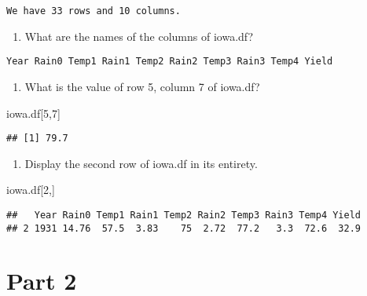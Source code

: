 \documentclass[
]{article}
\newenvironment{Shaded}{\begin{snugshade}}{\end{snugshade}}
\newcommand{\DecValTok}[1]{\textcolor[rgb]{0.00,0.00,0.81}{#1}}
\newcommand{\NormalTok}[1]{#1}
\providecommand{\tightlist}{%
  \setlength{\itemsep}{0pt}\setlength{\parskip}{0pt}}
\begin{document}
\begin{verbatim}
We have 33 rows and 10 columns.
\end{verbatim}

\begin{enumerate}
\def\labelenumi{\alph{enumi}.}
\setcounter{enumi}{2}
\tightlist
\item
  What are the names of the columns of iowa.df?
\end{enumerate}

\begin{verbatim}
Year Rain0 Temp1 Rain1 Temp2 Rain2 Temp3 Rain3 Temp4 Yield
\end{verbatim}

\begin{enumerate}
\def\labelenumi{\alph{enumi}.}
\setcounter{enumi}{3}
\tightlist
\item
  What is the value of row 5, column 7 of iowa.df?
\end{enumerate}

\begin{Shaded}
\begin{Highlighting}[]
\NormalTok{iowa.df[}\DecValTok{5}\NormalTok{,}\DecValTok{7}\NormalTok{]}
\end{Highlighting}
\end{Shaded}

\begin{verbatim}
## [1] 79.7
\end{verbatim}

\begin{enumerate}
\def\labelenumi{\alph{enumi}.}
\setcounter{enumi}{4}
\tightlist
\item
  Display the second row of iowa.df in its entirety.
\end{enumerate}

\begin{Shaded}
\begin{Highlighting}[]
\NormalTok{iowa.df[}\DecValTok{2}\NormalTok{,]}
\end{Highlighting}
\end{Shaded}

\begin{verbatim}
##   Year Rain0 Temp1 Rain1 Temp2 Rain2 Temp3 Rain3 Temp4 Yield
## 2 1931 14.76  57.5  3.83    75  2.72  77.2   3.3  72.6  32.9
\end{verbatim}

\hypertarget{part-2}{%
\section{Part 2}\label{part-2}}
\end{document}
